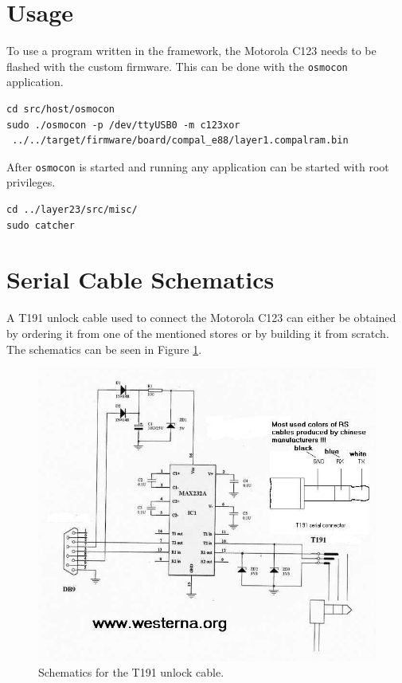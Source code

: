 \section{Usage}
\label{sec:osmo_usage}
To use a program written in the framework, the Motorola C123 needs to be flashed with the custom firmware.
This can be done with the \texttt{osmocon} application. 
\begin{lstlisting}
cd src/host/osmocon
sudo ./osmocon -p /dev/ttyUSB0 -m c123xor
 ../../target/firmware/board/compal_e88/layer1.compalram.bin
\end{lstlisting}
After \texttt{osmocon} is started and running any application can be started with root privileges.
\begin{lstlisting}
cd ../layer23/src/misc/
sudo catcher
\end{lstlisting}

\section{Serial Cable Schematics}
\label{sec:osmo_serial_schematics}
A T191 unlock cable used to connect the Motorola C123 can either be obtained by ordering it from one of the mentioned stores or by building it from scratch.
The schematics can be seen in Figure \ref{fig:schematics}.

\begin{figure}
\centering
\includegraphics[width=.9\textwidth]{../Images/t191cable}
\caption{Schematics for the T191 unlock cable.}
\label{fig:schematics}
\end{figure}

